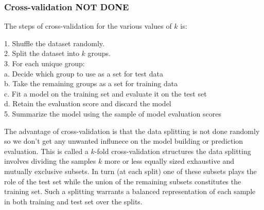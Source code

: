 \subsubsection{Cross-validation NOT DONE}
The steps of cross-validation for the various values of $k$ is:
\begin{mdframed}[backgroundcolor=black!10]
\raggedright

1. Shuffle the dataset randomly.\\

2. Split the dataset into $k$ groups.\\

3. For each unique group:\\

\hspace{1cm}a. Decide which group to use as a set for test data\\

\hspace{1cm}b. Take the remaining groups as a set for training data\\

\hspace{1cm}c. Fit a model on the training set and evaluate it on the test set\\

\hspace{1cm}d. Retain the evaluation score and discard the model\\

5. Summarize the model using the sample of model evaluation scores\\

\end{mdframed}

The advantage of cross-validation is that the data splitting is not done randomly so we don't get any unwanted influnece on the model building or prediction evaluation. This is called a  $k$-fold cross-validation structures the data splitting involves dividing the samples $k$ more or less equally sized exhaustive and
mutually exclusive subsets. In turn (at each split) one of these
subsets plays the role of the test set while the union of the
remaining subsets constitutes the training set. Such a splitting
warrants a balanced representation of each sample in both training and
test set over the splits. 
